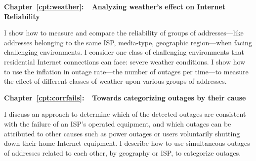 \textbf{Chapter~\ref{cpt:weather}:~~Analyzing weather's effect on
  Internet Reliability} 

I show how to measure and compare the reliability of groups of addresses---like
addresses belonging to the same ISP, media-type, geographic
region---when facing challenging environments. I consider one class of
challenging environments that residential Internet connections can
face: severe weather conditions. I show how to use the inflation in
outage rate---the number of outages per time---to measure the effect
of different classes of weather upon various groups of addresses.

\textbf{Chapter~\ref{cpt:corrfails}:~~Towards categorizing outages by
  their cause} 

I discuss an approach to determine which of the detected outages are
consistent with the failure of an ISP's operated equipment, and which
outages can be attributed to other causes such as power outages or
users voluntarily shutting down their home Internet equipment. I
describe how to use simultaneous outages of addresses related
to each other, by geography or ISP, to categorize outages.








